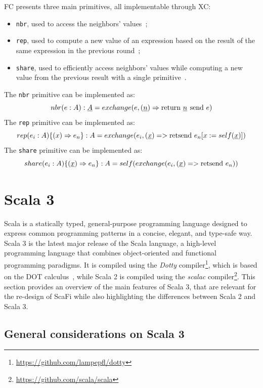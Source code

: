 \ac{FC} presents three main primitives, all implementable through \ac{XC}:
\begin{itemize}
    \item \texttt{nbr}, used to access the neighbors' values~\cite{from-dc-to-fc-and-ap};
    \item \texttt{rep}, used to compute a new value of an expression based on the result of the same expression in the previous round~\cite{from-dc-to-fc-and-ap};
    \item \texttt{share}, used to efficiently access neighbors' values while computing a new value from the previous result with a single primitive~\cite{share-operator}.
\end{itemize}

The \texttt{nbr} primitive can be implemented as: $$nbr(e: A): \underline{A} = exchange(e, (\underline{n}) \Rightarrow \operatorname{return\,} \underline{n} \operatorname{\:send\,} e)$$
%
The \texttt{rep} primitive can be implemented as: $$rep(e_i: A)\{(x) \Rightarrow e_n\}: A = exchange(e_i, (\underline{x}) => \operatorname{retsend\,} e_n[x := self(\underline{x})])$$
%
The \texttt{share} primitive can be implemented as: $$share(e_i: A)\{(\underline{x}) \Rightarrow e_n\}: A = self(exchange(e_i, (\underline{x}) => \operatorname{retsend\,} e_n))$$

\section{Scala 3}\label{chap:background->sec:scala3}

Scala is a statically typed, general-purpose programming language designed to express common programming patterns in a concise, elegant, and type-safe way.
%
Scala 3 is the latest major release of the Scala language, a high-level programming language that combines object-oriented and functional programming paradigms.
%
It is compiled using the \textit{Dotty} compiler\footnote{\url{https://github.com/lampepfl/dotty}}, which is based on the \ac{DOT} calculus~\cite{dot}, while Scala 2 is compiled using the \textit{scalac} compiler\footnote{\url{https://github.com/scala/scala}}.
%
This section provides an overview of the main features of Scala 3, that are relevant for the re-design of ScaFi while also highlighting the differences between Scala 2 and Scala 3.

\subsection{General considerations on Scala 3}

